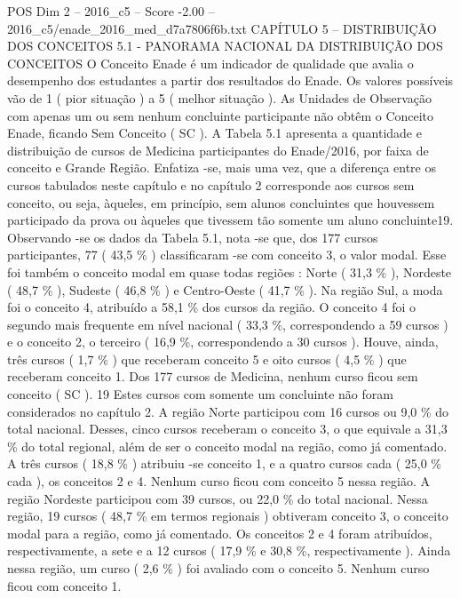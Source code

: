 \begin{textsample}{POS Dim 2 – 2016\_c5 – Score -2.00 – 2016\_c5/enade\_2016\_med\_d7a7806f6b.txt}  \label{ex:f2_pos_399}
CAPÍTULO 5 – DISTRIBUIÇÃO DOS CONCEITOS 5.1 - PANORAMA NACIONAL DA DISTRIBUIÇÃO DOS CONCEITOS O Conceito Enade é um indicador de qualidade que avalia o desempenho dos estudantes a partir dos resultados do Enade.
Os valores possíveis vão de 1 ( pior situação ) a 5 ( melhor situação ).
As Unidades de Observação com apenas um ou sem nenhum concluinte participante não obtêm o Conceito Enade, ficando Sem Conceito ( SC ).
A Tabela 5.1 apresenta a quantidade e distribuição de cursos de Medicina participantes do Enade/2016, por faixa de conceito e Grande Região.
Enfatiza -se, mais uma vez, que a diferença entre os cursos tabulados neste capítulo e no capítulo 2 corresponde aos cursos sem conceito, ou seja, àqueles, em princípio, sem alunos concluintes que houvessem participado da prova ou àqueles que tivessem tão somente um aluno concluinte19.
Observando -se os dados da Tabela 5.1, nota -se que, dos 177 cursos participantes, 77 ( 43,5 \% ) classificaram -se com conceito 3, o valor modal.
Esse foi também o conceito modal em quase todas regiões : Norte ( 31,3 \% ), Nordeste ( 48,7 \% ), Sudeste ( 46,8 \% ) e Centro-Oeste ( 41,7 \% ).
Na região Sul, a moda foi o conceito 4, atribuído a 58,1 \% dos cursos da região.
O conceito 4 foi o segundo mais frequente em nível nacional ( 33,3 \%, correspondendo a 59 cursos ) e o conceito 2, o terceiro ( 16,9 \%, correspondendo a 30 cursos ).
Houve, ainda, três cursos ( 1,7 \% ) que receberam conceito 5 e oito cursos ( 4,5 \% ) que receberam conceito 1.
Dos 177 cursos de Medicina, nenhum curso ficou sem conceito ( SC ). 19 Estes cursos com somente um concluinte não foram considerados no capítulo 2.
A região Norte participou com 16 cursos ou 9,0 \% do total nacional.
Desses, cinco cursos receberam o conceito 3, o que equivale a 31,3 \% do total regional, além de ser o conceito modal na região, como já comentado.
A três cursos ( 18,8 \% ) atribuiu -se conceito 1, e a quatro cursos cada ( 25,0 \% cada ), os conceitos 2 e 4.
Nenhum curso ficou com conceito 5 nessa região.
A região Nordeste participou com 39 cursos, ou 22,0 \% do total nacional.
Nessa região, 19 cursos ( 48,7 \% em termos regionais ) obtiveram conceito 3, o conceito modal para a região, como já comentado.
Os conceitos 2 e 4 foram atribuídos, respectivamente, a sete e a 12 cursos ( 17,9 \% e 30,8 \%, respectivamente ).
Ainda nessa região, um curso ( 2,6 \% ) foi avaliado com o conceito 5.
Nenhum curso ficou com conceito 1.

\end{textsample}

